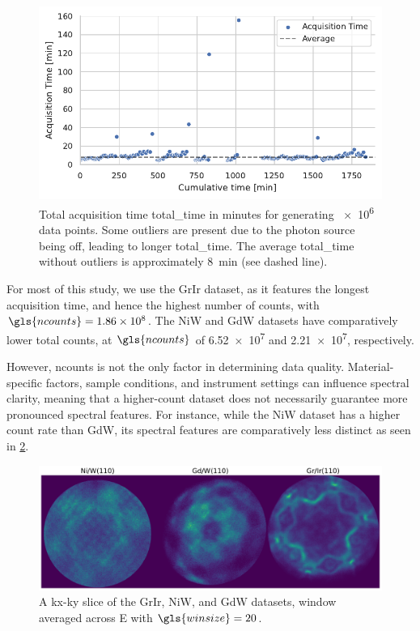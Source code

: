\begin{figure}[h]
    \centering
    \includegraphics[width=0.8\linewidth]{images/acq_time_1M.pdf}
    \caption{Total acquisition time \gls{total_time} in minutes for generating \num{e6} data points. Some outliers are present due to the photon source being off, leading to longer \gls{total_time}. The average \gls{total_time} without outliers is approximately \qty{8}{min} (see dashed line).}
    \label{fig:acq-time-1M}
\end{figure}

For most of this study, we use the \gls{GrIr} dataset, as it features the longest acquisition time, and hence the highest number of counts, with $\gls{ncounts}=\num{1.86e8}$. The \gls{NiW} and \gls{GdW} datasets have comparatively lower total counts, at $\gls{ncounts}$ of \num{6.52e7} and \num{2.21e7}, respectively. 

However, \gls{ncounts} is not the only factor in determining data quality. Material-specific factors, sample conditions, and instrument settings can influence spectral clarity, meaning that a higher-count dataset does not necessarily guarantee more pronounced spectral features. For instance, while the \gls{NiW} dataset has a higher count rate than \gls{GdW}, its spectral features are comparatively less distinct as seen in \cref{fig:all-hextof-datasets-kxky}.

\begin{figure}[h]
    \centering
    \includegraphics[width=1\linewidth]{images/datasets_3_kx_ky.pdf}
    \caption{A \gls{kx}-\gls{ky} slice of the \gls{GrIr}, \gls{NiW}, and \gls{GdW} datasets, window averaged across \gls{E} with $\gls{winsize}=\num{20}$.}
    \label{fig:all-hextof-datasets-kxky}
\end{figure}

